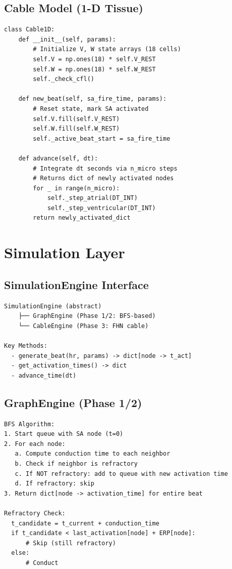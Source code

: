 \documentclass[11pt, a4paper]{article}
\begin{document}
\subsection{Cable Model (1-D Tissue)}

\begin{lstlisting}
class Cable1D:
    def __init__(self, params):
        # Initialize V, W state arrays (18 cells)
        self.V = np.ones(18) * self.V_REST
        self.W = np.ones(18) * self.W_REST
        self._check_cfl()
    
    def new_beat(self, sa_fire_time, params):
        # Reset state, mark SA activated
        self.V.fill(self.V_REST)
        self.W.fill(self.W_REST)
        self._active_beat_start = sa_fire_time
    
    def advance(self, dt):
        # Integrate dt seconds via n_micro steps
        # Returns dict of newly activated nodes
        for _ in range(n_micro):
            self._step_atrial(DT_INT)
            self._step_ventricular(DT_INT)
        return newly_activated_dict
\end{lstlisting}

\section{Simulation Layer}

\subsection{SimulationEngine Interface}

\begin{verbatim}
SimulationEngine (abstract)
    ├── GraphEngine (Phase 1/2: BFS-based)
    └── CableEngine (Phase 3: FHN cable)

Key Methods:
  - generate_beat(hr, params) -> dict[node -> t_act]
  - get_activation_times() -> dict
  - advance_time(dt)
\end{verbatim}

\subsection{GraphEngine (Phase 1/2)}

\begin{verbatim}
BFS Algorithm:
1. Start queue with SA node (t=0)
2. For each node:
   a. Compute conduction time to each neighbor
   b. Check if neighbor is refractory
   c. If NOT refractory: add to queue with new activation time
   d. If refractory: skip
3. Return dict[node -> activation_time] for entire beat

Refractory Check:
  t_candidate = t_current + conduction_time
  if t_candidate < last_activation[node] + ERP[node]:
      # Skip (still refractory)
  else:
      # Conduct
\end{verbatim}
\end{document}
